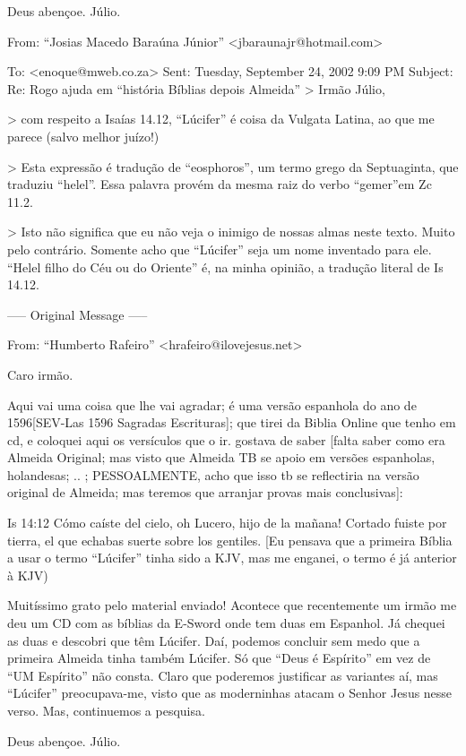 Deus abençoe. Júlio.   


From: ``Josias Macedo Baraúna Júnior'' <jbaraunajr@hotmail.com>

To: <enoque@mweb.co.za>
Sent: Tuesday, September 24, 2002 9:09 PM
Subject: Re: Rogo ajuda em ``história Bíblias depois Almeida''
> Irmão Júlio,

> com respeito a Isaías 14.12, ``Lúcifer'' é coisa da Vulgata Latina, ao que me parece (salvo melhor juízo!)

> Esta expressão é tradução de ``eosphoros'', um termo grego da Septuaginta, que traduziu ``helel''. Essa palavra provém da mesma raiz do verbo ``gemer''em Zc 11.2.

> Isto não significa que eu não veja o inimigo de nossas almas neste texto. Muito pelo contrário. Somente acho que ``Lúcifer'' seja um nome inventado para ele. ``Helel filho do Céu ou do Oriente'' é, na minha opinião, a tradução literal de Is 14.12.

----- Original Message ----- 

From: ``Humberto Rafeiro'' <hrafeiro@ilovejesus.net>

Caro irmão.

Aqui vai uma coisa que lhe vai agradar; é uma versão espanhola do ano
de 1596[SEV-Las 1596 Sagradas Escrituras]; que tirei da Biblia Online
que tenho em cd, e coloquei aqui os versículos que o ir. gostava de
saber [falta saber como era Almeida Original; mas visto que Almeida TB
se apoio em versões espanholas, holandesas; .. ; PESSOALMENTE, acho
que isso tb se reflectiria na versão original de Almeida; mas teremos
que arranjar provas mais conclusivas]:

Is 14:12 Cómo caíste del cielo, oh Lucero, hijo de la mañana! Cortado
fuiste por tierra, el que echabas suerte sobre los gentiles. [Eu
pensava que a primeira Bíblia a usar o termo ``Lúcifer'' tinha sido a
KJV, mas me enganei, o termo é já anterior à KJV)

Muitíssimo grato pelo material enviado! Acontece que recentemente um
irmão me deu um CD com as bíblias da E-Sword onde tem duas em
Espanhol. Já chequei as duas e descobri que têm Lúcifer. Daí, podemos
concluir sem medo que a primeira Almeida tinha também Lúcifer. Só que
``Deus é Espírito'' em vez de ``UM Espírito'' não consta. Claro que
poderemos justificar as variantes aí, mas ``Lúcifer'' preocupava-me,
visto que as moderninhas atacam o Senhor Jesus nesse verso. Mas,
continuemos a pesquisa.

Deus abençoe. Júlio.

